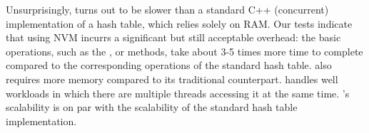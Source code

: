     Unsurprisingly, \PHT turns out to be slower than a standard C++ (concurrent)  implementation of a hash table, which relies solely on RAM. Our tests indicate that using NVM incurrs a significant but still acceptable overhead: the basic operations, such as the \getMethod, \insertMethod or \removeMethod methods, take about 3-5 times more time to complete compared to the corresponding operations of the standard hash table. \PHT also requires  more memory compared to its traditional counterpart. \PHT handles well workloads in which there are multiple threads accessing it at the same time. \PHT's scalability is on par with the scalability of the standard hash table implementation.
    

